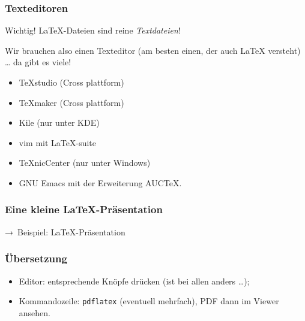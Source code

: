 \documentclass{cms-kurs}
\begin{document}
\begin{frame}
  \frametitle{Texteditoren}

  \onslide<+->

  \begin{block}{Wichtig!}
    \LaTeX-Dateien sind reine \emph{Textdateien}!
  \end{block}

  \onslide<+->

  Wir brauchen also einen Texteditor (am besten einen, der auch \LaTeX{}
  versteht) \dots{} \onslide<+-> da gibt es viele!
  \begin{itemize}
  \item TeXstudio (Cross plattform)
  \item TeXmaker  (Cross plattform)
  \item Kile      (nur unter KDE)
  \item vim mit LaTeX-suite
  \item TeXnicCenter (nur unter Windows)
  \item GNU Emacs mit der Erweiterung AUCTeX.
  \end{itemize}

\end{frame}

\begin{frame}
  \frametitle{Eine kleine \LaTeX-Präsentation}

  \onslide<+->

  → Beispiel: \LaTeX{}-Präsentation

\end{frame}

\begin{frame}
  \frametitle{Übersetzung}

  \onslide<+->

  \begin{itemize}
  \item<+-> Editor: entsprechende Knöpfe drücken (ist bei allen anders …);
  \item<+-> Kommandozeile: \lstinline{pdflatex} (eventuell mehrfach), PDF dann
    im Viewer ansehen.
  \end{itemize}

\end{frame}
\end{document}
